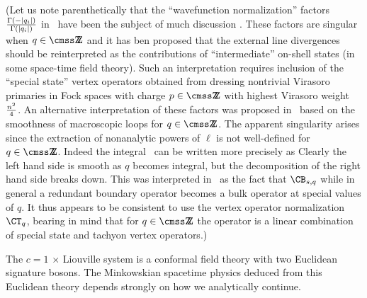 (Let us note parenthetically that 
the ``wavefunction normalization'' factors 
$ {\Gamma(-|q_i|)\over \Gamma(|q_i|)}$ 
in \modspace\ have been the subject of much 
discussion
\nref{}%
\nref{}%
\nref{}%
\nref{}%
.
These factors are singular when $q\in \IZ$ and it has ben proposed that the
external line divergences should be reinterpreted as the contributions of
``intermediate'' on-shell states (in some space-time field theory). 
Such an interpretation requires inclusion of the 
``special state'' vertex operators obtained from dressing 
nontrivial Virasoro primaries in Fock spaces with 
charge $p\in \IZ$ with highest Virasoro weight 
${n^2\over 4}$. An alternative 
interpretation of these factors was proposed in \lpsflds\ 
based on the smoothness of macroscopic loops for $q\in\IZ$. 
The apparent singularity arises since the extraction of 
nonanalytic powers of $\ell$ is not well-defined for 
$q\in\IZ$. Indeed the integral \intgl\ can be written
more precisely as
\eqn{}
Clearly the left hand side is smooth as $q$ becomes integral, but 
the decomposition of the right hand side breaks down.
This was interpreted in \lpsflds\ as the fact 
that $\CB_{s,q}$ while in general a redundant boundary operator 
becomes a bulk operator at special values of $q$. It thus appears to 
be consistent to use the vertex operator normalization 
$\CT_q$, bearing in mind that for $q\in\IZ$ the operator 
is a linear combination of special state and tachyon vertex
operators.) 
 
 
The $c=1$ $\times$ Liouville system is a conformal field 
theory with two Euclidean signature bosons. The Minkowskian
spacetime physics deduced from this Euclidean theory
depends strongly on how we analytically continue.
 
